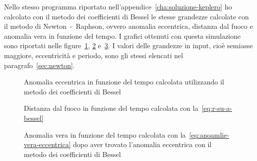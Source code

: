 Nello stesso programma riportato nell'appendice~\ref{cha:soluzione-keplero} ho
calcolato con il metodo dei coefficienti di Bessel le stesse grandezze calcolate
con il metodo di Newton~-~Raphson, ovvero anomalia eccentrica, distanza dal
fuoco e anomalia vera in funzione del tempo. I grafici ottenuti con questa
simulazione sono riportati nelle figure~\ref{fig:bessel-anomalia_eccentrica},
\ref{fig:bessel-raggio} e~\ref{fig:bessel-anomalia_vera}. I valori delle
grandezze in input, cioè semiasse maggiore, eccentricità e periodo, sono gli
stessi elencati nel paragrafo~\ref{sec:newton}.

\begin{figure}
  \centering
  
  \caption[Anomalia eccentrica in funzione del tempo con il metodo dei
  coefficienti di Bessel]{Anomalia eccentrica in funzione del tempo calcolata
    utilizzando il metodo dei coefficienti di Bessel}
  \label{fig:bessel-anomalia_eccentrica}
\end{figure}
\begin{figure}
  \centering
  
  \caption[Distanza dal fuoco in funzione del tempo con il metodo dei
  coefficienti di Bessel]{Distanza dal fuoco in funzione del tempo calcolata con
    la~\eqref{eq:r-su-a-bessel}}
  \label{fig:bessel-raggio}
\end{figure}
\begin{figure}
  \centering
  
  \caption[Anomalia vera in funzione del tempo con il metodo dei coefficienti di
  Bessel]{Anomalia vera in funzione del tempo calcolata con
    la~\eqref{eq:anoamlie-vera-eccentrica} dopo aver trovato l'anomalia
    eccentrica con il metodo dei coefficienti di Bessel}
  \label{fig:bessel-anomalia_vera}
\end{figure}


